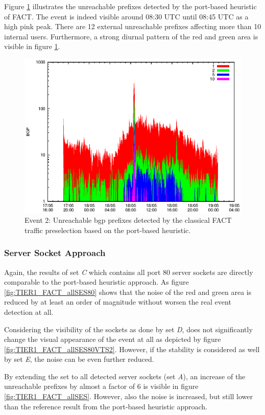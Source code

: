 Figure \ref{fig:TIER1_FACT_REF} illustrates the unreachable prefixes detected by the port-based heuristic of \gls{FACT}. 
The event is indeed visible around 08:30 UTC until 08:45 UTC as a high pink peak. 
There are 12 external unreachable prefixes affecting more than 10 internal users. 
Furthermore, a strong diurnal pattern of the red and green area is visible in figure \ref{fig:TIER1_FACT_REF}. 
\begin{figure}
	[p] \centering 
	\includegraphics[width=0.75\linewidth]{images/events/2010_05_18/bgp_log_port80_ref.eps} \caption{Event 2: Unreachable \gls{bgp} prefixes detected by the classical \gls{FACT} traffic preselection based on the port-based heuristic.} 
	\label{fig:TIER1_FACT_REF} 
\end{figure}

\subsubsection{Server Socket Approach}

Again, the results of set \emph{C} which contains all port 80 \glspl{server socket} are directly comparable to the port-based heuristic approach. 
As figure \ref{fig:TIER1_FACT_allSES80} shows that the noise of the red and green area is reduced by at least an order of magnitude without worsen the real event detection at all.

Considering the visibility of the sockets as done by set \emph{D}, does not significantly change the visual appearance of the event at all as depicted by figure \ref{fig:TIER1_FACT_allSES80VTS2}. 
However, if the stability is considered as well by set \emph{E}, the noise can be even further reduced. 

By extending the set to all detected \glspl{server socket} (set \emph{A}), an increase of the unreachable prefixes by almost a factor of 6 is visible in figure \ref{fig:TIER1_FACT_allSES}. 
However, also the noise is increased, but still lower than the reference result from the port-based heuristic approach. 

